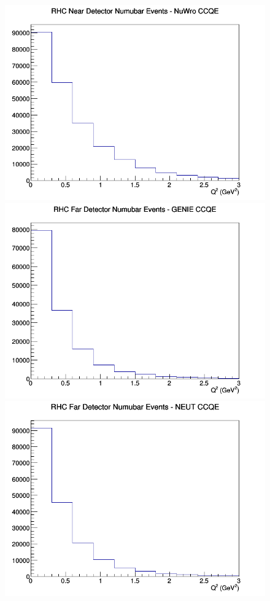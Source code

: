 \documentclass[12pt]{article}
\begin{document}
\begin{figure}[h]
\includegraphics[width=\linewidth]{Q2/nominal/CCQE_RHC_ND_numubar_Q2_NuWro.png}
\endminipage
\newline
{}
\includegraphics[width=\linewidth]{Q2/nominal/CCQE_RHC_FD_numubar_Q2_GENIE.png}
\endminipage
{}
\includegraphics[width=\linewidth]{Q2/nominal/CCQE_RHC_FD_numubar_Q2_NEUT.png}

\end{figure}
\end{document}

